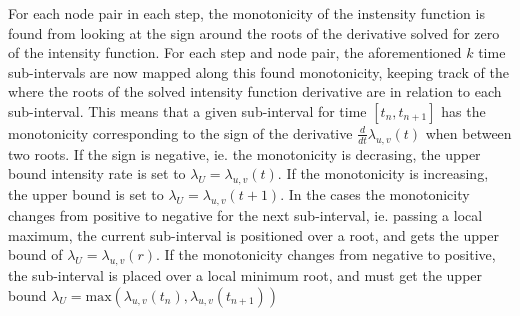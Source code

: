 For each node pair in each step, the monotonicity of the instensity function is found from looking at the sign around the roots of the derivative solved for zero of the intensity function.
For each step and node pair, the aforementioned $k$ time sub-intervals are now mapped along this found monotonicity, keeping track of the where the roots of the solved intensity function derivative are in relation to each sub-interval.
This means that a given sub-interval for time $[t_n,t_{n+1}]$ has the monotonicity corresponding to the sign of the derivative $\frac{d}{dt} \lambda_{u,v}(t)$ when between two roots.
If the sign is negative, ie. the monotonicity is decrasing, the upper bound intensity rate is set to $\lambda_U = \lambda_{u,v}(t)$.
If the monotonicity is increasing, the upper bound is set to $\lambda_U = \lambda_{u,v}(t+1)$.
In the cases the monotonicity changes from positive to negative for the next sub-interval, ie. passing a local maximum, the current sub-interval is positioned over a root, and gets the upper bound of $\lambda_U = \lambda_{u,v}(r)$.
If the monotonicity changes from negative to positive, the sub-interval is placed over a local minimum root, and must get the upper bound $\lambda_U = \text{max}(\lambda_{u,v}(t_n), \lambda_{u,v}(t_{n+1}))$
